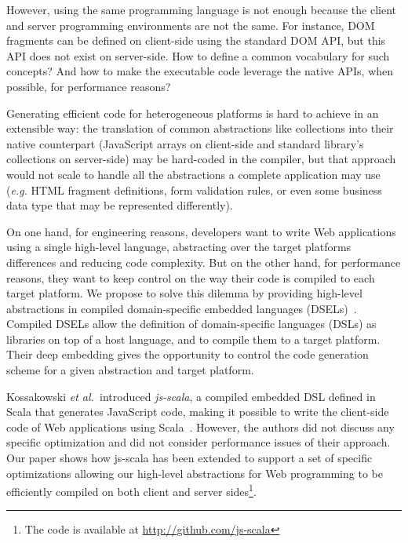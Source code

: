 \documentclass{llncs}
\newcommand{\eg}{\emph{e.g.}}
\newcommand{\etal}{\emph{et al.~}}
\begin{document}
However, using the same programming language is not enough because the client and server programming
environments are not the same. For instance, DOM fragments can be defined on client-side using the
standard DOM API, but this API does not exist on server-side. How to define a common vocabulary for
such concepts? And how to make the executable code leverage the native APIs, when possible, for
performance reasons?

Generating efficient code for heterogeneous platforms is hard to achieve in an extensible way: the
translation of common abstractions like collections into their native counterpart (JavaScript arrays
on client-side and standard library's collections on server-side) may be hard-coded in the compiler,
but that approach would not scale to handle all the abstractions a complete application may use
(\eg{} HTML fragment definitions, form validation rules, or even some business data type that may be
represented differently).

On one hand, for engineering reasons, developers want to write Web applications using a single
high-level language, abstracting over the target platforms differences and reducing code complexity.
But on the other hand, for performance reasons, they want to keep control on the way their code is
compiled to each target platform. We propose to solve this dilemma by providing high-level
abstractions in compiled domain-specific embedded languages (DSELs)~\cite{Hudak96_DSEL,Elliott2003_Compiling}. Compiled DSELs allow the definition of domain-specific languages (DSLs) as
libraries on top of a host language, and to compile them to a target platform. Their deep embedding
gives the opportunity to control the code generation scheme for a given abstraction and target
platform.

Kossakowski \etal introduced \emph{js-scala}, a compiled embedded DSL defined in Scala that
generates JavaScript code, making it possible to write the client-side code of Web applications
using Scala~\cite{Kossakowski12_JsDESL}. However, the authors did not discuss any specific optimization and did not consider performance issues of their approach. Our paper shows how js-scala has been extended to support a set of specific optimizations allowing our high-level abstractions for Web programming to be efficiently compiled on both client and server sides\footnote{The code is available at \href{http://github.com/js-scala}{http://github.com/js-scala}}.

\end{document}
